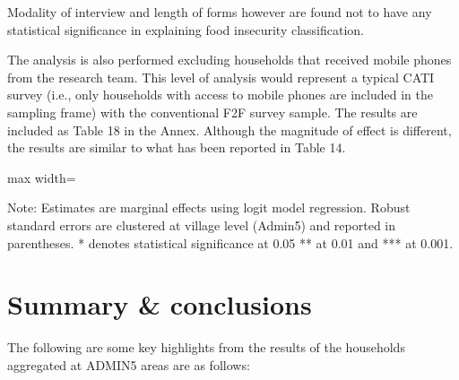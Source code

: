 \documentclass[11pt,harvard]{article}
\begin{document}
Modality of interview and length of forms however are found not to have any statistical significance in explaining food insecurity classification.

The analysis is also performed excluding households that received mobile phones from the research team. This level of analysis would represent a typical CATI survey (i.e., only households with access to mobile phones are included in the sampling frame) with the conventional F2F survey sample. The results are included as Table 18 in the Annex. Although the magnitude of effect is different, the results are similar to what has been reported in Table 14.

\begin{table}[htbp]
	\centering
	\begin{adjustbox}{max width=\textwidth}
		\begin{threeparttable}
			\caption{Logit Regression on Food Security based Outcomes}
			\scriptsize
			 
			\label{tab:CAR_FS_Logit}
			\begin{tablenotes}
				\item Note: Estimates are marginal effects using logit model regression. Robust standard errors are clustered at village level (Admin5) and reported in parentheses. * denotes statistical significance at 0.05 ** at 0.01 and *** at 0.001.
			\end{tablenotes}
		\end{threeparttable}
	\end{adjustbox}
\end{table}


\pagebreak

	
\section{Summary \& conclusions}
		
The following are some key highlights from the results of the households aggregated at ADMIN5 areas are as follows:
\end{document}
